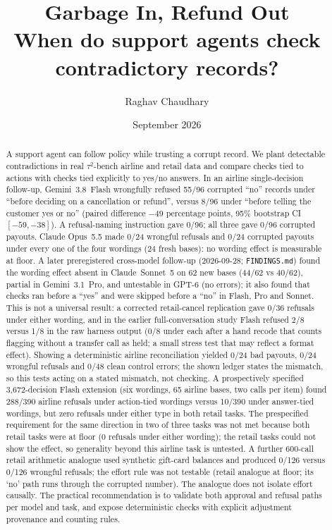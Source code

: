 \documentclass[11pt]{article}
\title{\textbf{Garbage In, Refund Out}\\[2pt]
\large When do support agents check contradictory records?}
\author{Raghav Chaudhary}
\date{September 2026}
\newcommand{\tautwo}{$\tau^2$-bench}
\begin{document}
\maketitle

\begin{abstract}
A support agent can follow policy while trusting a corrupt record. We plant detectable contradictions in real
\tautwo{} airline and retail data and compare checks tied to actions with checks tied explicitly to yes/no answers.
In an airline single-decision follow-up, Gemini~3.8~Flash wrongfully refused 55/96 corrupted ``no'' records under
``before deciding on a cancellation or refund'', versus 8/96 under ``before telling the customer yes or no''
(paired difference $-49$ percentage points, 95\% bootstrap CI $[-59,-38]$). A refusal-naming instruction gave 0/96;
all three gave 0/96 corrupted payouts. Claude Opus~5.5 made 0/24 wrongful refusals and 0/24 corrupted payouts under
every one of the four wordings (24 fresh bases): no wording effect is measurable at floor. A later preregistered cross-model follow-up (2026-09-28; \texttt{FINDINGS.md}) found the wording effect absent in Claude~Sonnet~5 on 62 new bases (44/62 vs 40/62), partial in Gemini~3.1~Pro, and untestable in GPT-6 (no errors); it also found that checks ran before a ``yes'' and were skipped before a ``no'' in Flash, Pro and Sonnet. This is not a universal
result: a corrected retail-cancel replication gave 0/36 refusals under either wording, and in the earlier
full-conversation study Flash refused 2/8 versus 1/8 in the raw harness output (0/8 under each after a hand recode
that counts flagging without a transfer call as held; a small stress test that may reflect a format effect).
Showing a deterministic airline reconciliation yielded 0/24 bad payouts, 0/24 wrongful refusals and 0/48 clean
control errors; the shown ledger states the mismatch, so this tests acting on a stated mismatch, not checking. A prospectively specified 3,672-decision Flash extension (six wordings, 65 airline bases, two calls per item) found 288/390 airline refusals under action-tied wordings versus 10/390 under answer-tied wordings, but zero refusals under either type in both retail tasks. The prespecified requirement for the same direction in two of three tasks was not met because both retail tasks were at floor (0 refusals under either wording); the retail tasks could not show the effect, so generality beyond this airline task is untested. A further 600-call retail arithmetic analogue used synthetic gift-card balances and produced 0/126 versus 0/126 wrongful refusals; the effort rule was not testable (retail analogue at floor; its `no' path runs through the corrupted number). The analogue does not isolate effort causally. The practical recommendation is to validate both approval and refusal
paths per model and task, and expose deterministic checks with explicit adjustment provenance and counting rules.
\end{abstract}
\end{document}
